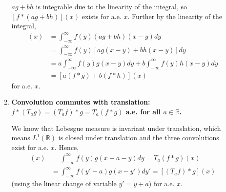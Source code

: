 \documentclass[a4paper,12pt]{article}
\begin{document}
\begin{enumerate}
\begin{enumerate}
{                }\unboldmath \par
                $ag + bh$ is integrable due to the linearity of the integral, so $[f * (ag + bh)](x)$ exists for a.e. $x$. Further by the linearity of the integral,
                \begin{align*}
                    [f * (ag + bh)](x) &= \int_{-\infty}^\infty f(y)(ag + bh)(x - y) dy \\
                    &= \int_{-\infty}^\infty f(y) [ag(x - y) + bh(x - y)]dy \\
                    &= a \int_{-\infty}^\infty f(y) g(x - y) dy + b \int_{-\infty}^\infty f(y) h(x - y) dy \\
                    &= [a(f * g) + b(f * h)](x)
                \end{align*}
                for a.e. $x$.

            \item
                \boldmath\textbf{Convolution commutes with translation: $f * (T_a g) = (T_a f) * g = T_a(f * g)$ a.e. for all $a \in \mathbb{R}$.
                }\unboldmath \par
                We know that Lebesgue measure is invariant under translation, which means $L^1(\mathbb{R})$ is closed under translation and the three convolutions exist for a.e. $x$. Hence,
                \begin{align*}
                    [f * (T_a g)](x) &= \int_{-\infty}^\infty f(y) g(x - a - y) dy = T_a (f * g)(x) \\
                    &= \int_{-\infty}^\infty f(y' - a) g(x - y') dy' = [(T_a f) * g](x)
                \end{align*}
                (using the linear change of variable $y' = y + a$) for a.e. $x$.
        \end{enumerate}


\end{enumerate}
\end{document}
